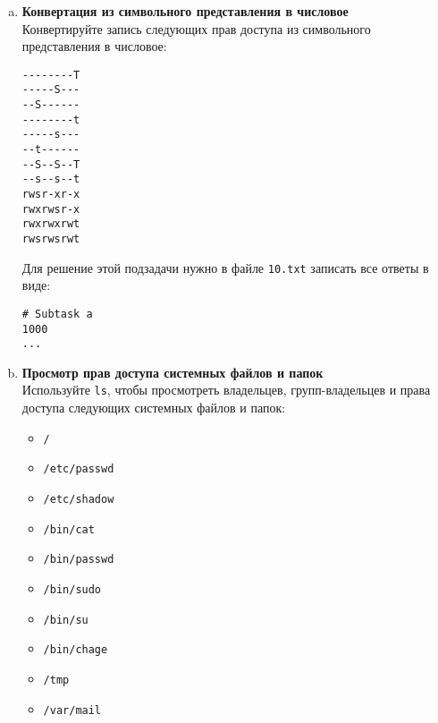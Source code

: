 \documentclass{article}
\begin{document}
\begin{enumerate}[a.]
\item \textbf{Конвертация из символьного представления в числовое}\\
Конвертируйте запись следующих прав доступа из символьного представления в числовое:
\begin{lstlisting}
--------T
-----S---
--S------
--------t
-----s---
--t------
--S--S--T
--s--s--t
rwsr-xr-x
rwxrwsr-x
rwxrwxrwt
rwsrwsrwt
\end{lstlisting}
Для решение этой подзадачи нужно в файле \texttt{10.txt} записать все ответы в виде:
\begin{lstlisting}
# Subtask a
1000
...
\end{lstlisting}

\item \textbf{Просмотр прав доступа системных файлов и папок}\\
Используйте \texttt{ls}, чтобы просмотреть владельцев, групп-владельцев и права доступа следующих системных файлов и папок:
\begin{itemize}
\item \texttt{/}
\item \texttt{/etc/passwd}
\item \texttt{/etc/shadow}
\item \texttt{/bin/cat}
\item \texttt{/bin/passwd}
\item \texttt{/bin/sudo}
\item \texttt{/bin/su}
\item \texttt{/bin/chage}
\item \texttt{/tmp}
\item \texttt{/var/mail}
\end{itemize}
\end{enumerate}


\iffalse
\newpage
~
\newpage
\end{document}
